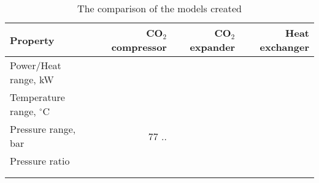 \begin{table}
\label{tab:DiscussionComparison}
\caption{The comparison of the models created}
\begin{center}
\begin{tabulary}{0.9\textwidth}{LRRR}
\toprule
Property    	                &	CO$_2$ compressor   & CO$_2$	expander    & Heat exchanger    \\
\midrule
Power/Heat range, kW            &                       &                       &                   \\
Temperature range, $^\circ$C    &                       &                       &                   \\
Pressure range, bar             &   77 ..               &                       &                   \\
Pressure ratio                  &                       &                       &                   \\
& & & \\
& & & \\
\bottomrule
\end{tabulary}
\end{center}
\end{table}